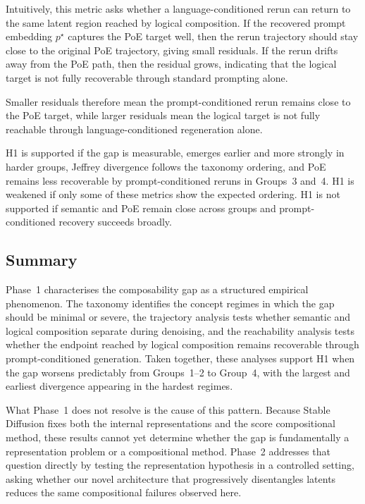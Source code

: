 Intuitively, this metric asks whether a language-conditioned rerun can return to the same latent region reached by logical composition. 
If the recovered prompt embedding \(p^\star\) captures the PoE target well, then the rerun trajectory should stay close to the original PoE trajectory, giving small residuals. 
If the rerun drifts away from the PoE path, then the residual grows, indicating that the logical target is not fully recoverable through standard prompting alone. 

Smaller residuals therefore mean the prompt-conditioned rerun remains close to the PoE target, while larger residuals mean the logical target is not fully reachable through language-conditioned regeneration alone.

H1 is supported if the gap is measurable, emerges earlier and more strongly in harder groups, Jeffrey divergence follows the taxonomy ordering, and PoE remains less recoverable by prompt-conditioned reruns in Groups~3 and~4. 
H1 is weakened if only some of these metrics show the expected ordering. 
H1 is not supported if semantic and PoE remain close across groups and prompt-conditioned recovery succeeds broadly.

\subsection{Summary}
\label{subsec:p1_predictions}

Phase~1 characterises the composability gap as a structured empirical phenomenon. The taxonomy
identifies the concept regimes in which the gap should be minimal or severe, the trajectory analysis
tests whether semantic and logical composition separate during denoising, and the reachability
analysis tests whether the endpoint reached by logical composition remains recoverable through
prompt-conditioned generation. Taken together, these analyses support H1 when the gap worsens
predictably from Groups~1--2 to Group~4, with the largest and earliest divergence appearing in the
hardest regimes.

What Phase~1 does not resolve is the cause of this pattern. Because Stable Diffusion \citep{rombach2022high} fixes both the internal
representations and the score compositional method, these results cannot yet determine whether the gap
is fundamentally a representation problem or a compositional method. Phase~2 addresses that question
directly by testing the representation hypothesis in a controlled setting, asking whether our novel architecture that
progressively disentangles latents reduces the same compositional failures observed here.
